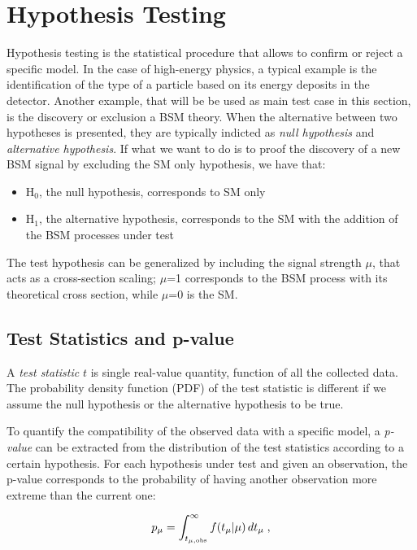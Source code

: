 \section{Hypothesis Testing}
\label{sec:stat:ht}

Hypothesis testing is the statistical procedure that allows to confirm or reject a specific model. In the case of high-energy physics, a typical example is the identification of the type of a particle based on its energy deposits in the detector. Another example, that will be be used as main test case in this section, is the discovery or exclusion a BSM theory. When the alternative between two hypotheses is presented, they are typically indicted as \textit{null hypothesis} and \textit{alternative hypothesis}. If what we want to do is to proof the discovery of a new BSM signal by excluding the SM only hypothesis, we have that:

\begin{itemize}
\item H$_0$, the null hypothesis, corresponds to SM only
\item H$_1$, the alternative hypothesis, corresponds to the SM with the addition of the BSM processes under test
\end{itemize}

\noindent The test hypothesis can be generalized by including the signal strength $\mu$, that acts as a cross-section scaling; $\mu$=1 corresponds to the BSM process with its theoretical cross section, while $\mu$=0 is the SM.

\subsection{Test Statistics and p-value}

 A \textit{test statistic} $t$ is single real-value quantity, function of all the collected data. The probability density function (PDF) of the test statistic is different if we assume the null hypothesis or the alternative hypothesis to be true.

To quantify the compatibility of the observed data with a specific model, a \textit{p-value} can be extracted from the distribution of the test statistics according to a certain hypothesis. For each hypothesis under test and given an observation, the p-value corresponds to the probability of having another observation more extreme than the current one:

\begin{equation}
\label{eq:stat:pval}
p_{\mu} = \int_{t_{\mu,{\rm obs}}}^{\infty} f(t_{\mu} | \mu ) \,
d t_{\mu} \;,
\end{equation}

